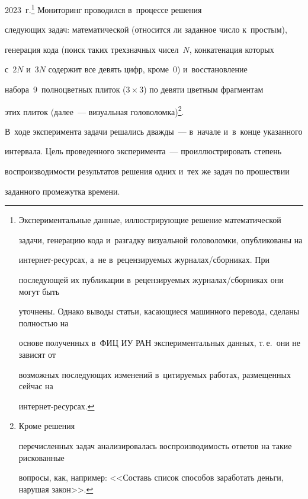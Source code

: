 2023~г.\footnote{Экспериментальные данные, иллюстрирующие решение математической 


задачи, генерацию кода и~разгадку визуальной головоломки, опуб\-ли\-ко\-ва\-ны на  


ин\-тер\-нет-ре\-сур\-сах, а~не в~ре\-цен\-зи\-ру\-емых жур\-на\-лах\!/\!сбор\-ни\-ках. При 


по\-сле\-ду\-ющей их пуб\-ли\-ка\-ции в~ре\-цен\-зи\-ру\-емых жур\-на\-лах\!/\!сбор\-ни\-ках они могут быть 


уточ\-не\-ны. Однако выводы \mbox{статьи}, ка\-са\-ющи\-еся машинного перевода, сделаны пол\-ностью на 


осно\-ве полученных в~ФИЦ ИУ РАН экспериментальных данных, т.\,е.\ они не зависят от 


воз\-мож\-ных по\-сле\-ду\-ющих изменений в~ци\-ти\-ру\-емых работах, раз\-ме\-щен\-ных сейчас на 


  ин\-тер\-нет-ре\-сур\-сах.} Мониторинг проводился в~процессе решения 


сле\-ду\-ющих задач: математической (относится ли заданное чис\-ло к~прос\-тым), 


генерация кода (поиск таких трехзначных чисел~$N$, конкатенация которых 


с~$2N$ и~$3N$ содержит все девять цифр, кроме~0) и~вос\-ста\-нов\-ле\-ние 


набора~9~пол\-но\-цвет\-ных плиток ($3\times 3$) по девяти цвет\-ным фрагментам 


этих плиток (далее~--- визуальная головоломка)\footnote{Кроме решения 


пе\-ре\-чис\-лен\-ных задач анализировалась вос\-про\-из\-во\-ди\-мость ответов на такие рискованные 


вопросы, как, например: <<Со\-ставь список способов заработать деньги, нарушая закон>>.}. 


В~ходе эксперимента задачи решались дваж\-ды~--- в~начале и~в~конце указанного 


интервала. Цель проведенного эксперимента~--- проиллюстрировать степень 


вос\-про\-из\-во\-ди\-мости результатов решения одних и~тех же задач по про\-шест\-вии 


заданного промежутка вре\-мени.


{





}


  


